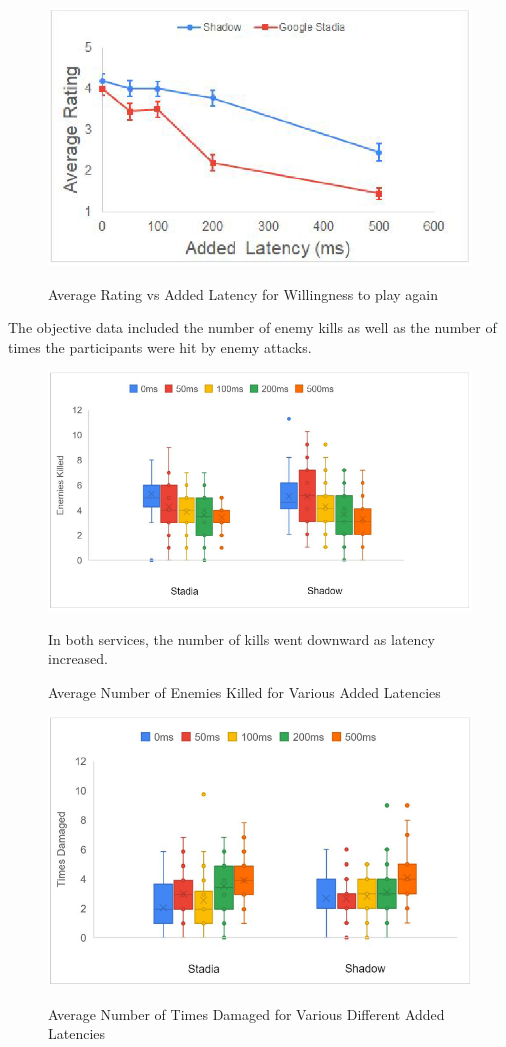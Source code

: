 \begin{figure}[H]
	\centering
	\includegraphics[width=12cm]{../img/fig15.png}
	\caption{Average Rating vs Added Latency for Willingness to play again}
	\parencite[Chapter 4.2.2, Page 37, Figure 15]{desveaux2020effects}
\end{figure}
The objective data \parencite[Chapter 4.2.3, Page 39]{desveaux2020effects} included the number of enemy kills as well as the number of times the participants were hit by enemy attacks.
\begin{figure}[H]
	\centering
	\includegraphics[width=12cm]{../img/fig16.png}
	\caption{Average Number of Enemies Killed for Various Added Latencies}
	In both services, the number of kills went downward as latency increased.\\
	\parencite[Chapter 4.2.3, Page 40, Figure 16]{desveaux2020effects}
\end{figure}
\begin{figure}[H]
	\centering
	\includegraphics[width=12cm]{../img/fig17.png}
	\caption{Average Number of Times Damaged for Various Different Added Latencies}
	\parencite[Chapter 4.2.3, Page 40, Figure 17]{desveaux2020effects}
\end{figure}
